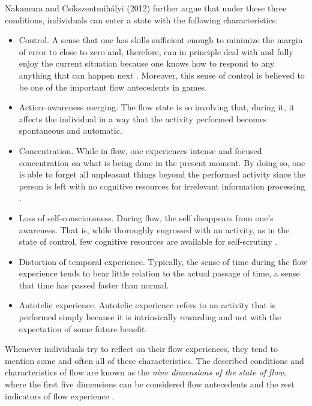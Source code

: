 Nakamura and Cs\'{i}kszentmih\'{a}lyi (2012) further argue that under these three conditions, individuals can enter a state with the following characteristics:
\begin{itemize}
\item Control. A sense that one has skills sufficient enough to minimize the margin of error to close to zero and, therefore, can in principle deal with and fully enjoy the current situation because one knows how to respond to any anything that can happen next \cite{csikszentmihalyi2014flow}. Moreover, this sense of control is believed to be one of the important flow antecedents in games\cite{kiili2006evaluations}. 
\item Action–awareness merging. The flow state is so involving that, during it, it affects the individual in a way that the activity performed becomes spontaneous and automatic.
\item Concentration. While in flow, one experiences intense and focused concentration on what is being done in the present moment. By doing so, one is able to forget all unpleasant things beyond the performed activity since the person is left with no cognitive resources for irrelevant information processing \cite{kiili2006evaluations}. 
\item Loss of self-consciousness. During flow, the self disappears from one's awareness. That is, while thoroughly engrossed with an activity, as in the state of control, few cognitive resources are
available for self-scrutiny \cite{kiili2006evaluations}.
\item Distortion of temporal experience. Typically, the sense of time
during the flow experience tends to bear little relation to the actual passage of time, a
sense that time has passed faster than normal.
\item Autotelic experience. Autotelic experience refers to an activity that is performed simply because it is intrinsically rewarding and not with the expectation of some future benefit.
\end{itemize}
Whenever individuals try to reflect on their flow experiences, they tend to mention some and often all of these characteristics. The described conditions and characteristics of flow are known as the \textit{nine dimensions of the state of flow}, where the first five dimensions can be considered flow antecedents and the rest indicators of flow experience  \cite{kiili2006evaluations}.
